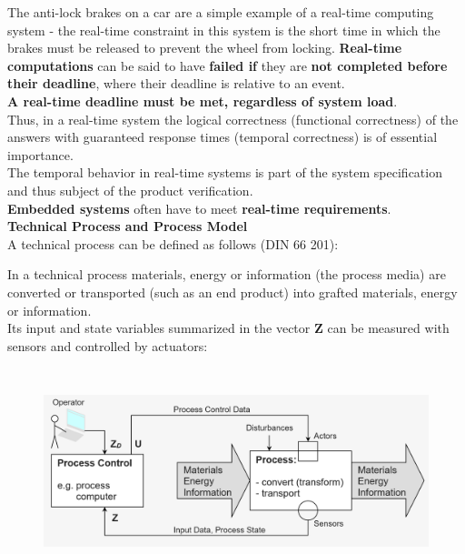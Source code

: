 The anti-lock brakes on a car are a simple example of a real-time computing system - the real-time constraint in this system is the short time in which the brakes must be released to prevent the wheel from locking. \textbf{Real-time computations} can be said to have \textbf{failed if} they are \textbf{not completed before their deadline}, where their deadline is relative to an event. \\

\textbf{A real-time deadline must be met, regardless of system load}.\\

Thus, in a real-time system the logical correctness (functional correctness) of the answers with guaranteed response times (temporal correctness) is of essential importance. \\

The temporal behavior in real-time systems is part of the system specification and thus subject of the product verification.\\

\textbf{Embedded systems} often have to meet \textbf{real-time requirements}.\\

{\rot\bf Technical Process and Process Model}\\

A technical process can be defined as follows (DIN 66 201):

In a technical process materials, energy or information (the process media) are converted or transported (such as an end product) into grafted materials, energy or information. \\

Its input and state variables summarized in the vector \textbf{Z} can be measured with sensors and controlled by actuators: \\

\begin{figure}[h]
    \centering
    \includegraphics[width=14cm, height=6cm]{Images/image60.png}
    \label{fig:Fig 3}
\end{figure}

